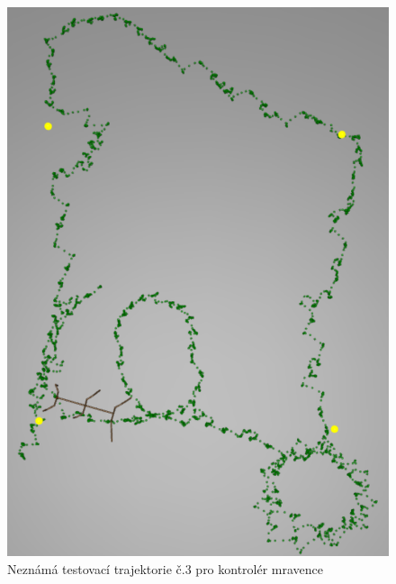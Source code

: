 \begin{figure}[h]
\begin{minipage}[c]{0.48\linewidth}
    \end{minipage}
    \hfill
    \begin{minipage}[c]{0.48\linewidth}
        \includegraphics[width=\linewidth]{obrazky/mravenec_testovaci_trajektorie3.png}
        \caption{Neznámá testovací trajektorie č.3 pro kontrolér mravence}
        \label{fig:mravenec_testovaci_trajektorie3}
    \end{minipage}
\end{figure}


\clearpage







